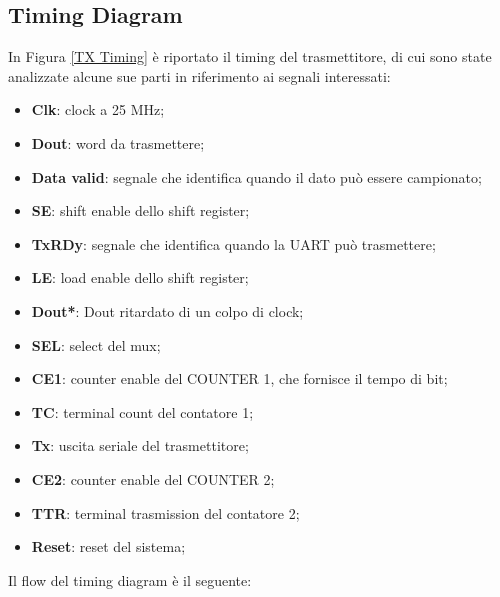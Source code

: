 \documentclass[a4paper, titlepage]{article}
\begin{document}
\subsection{Timing Diagram}%
In Figura \ref{TX Timing} è riportato il timing del trasmettitore, di cui sono state analizzate alcune sue parti in riferimento ai segnali interessati:
\begin{itemize}
\item 	\textbf{Clk}: clock a 25 MHz;
\item 	\textbf{Dout}: word da trasmettere;
\item 	\textbf{Data valid}: segnale che identifica quando il dato può essere campionato;
\item 	\textbf{SE}: shift enable dello shift register;
\item 	\textbf{TxRDy}: segnale che identifica quando la UART può trasmettere;
\item 	\textbf{LE}: load enable dello shift register;
\item 	\textbf{Dout*}: Dout ritardato di un colpo di clock;
\item 	\textbf{SEL}: select del mux;
\item 	\textbf{CE1}: counter enable del COUNTER 1, che fornisce il tempo di bit;
\item 	\textbf{TC}: terminal count del contatore 1;
\item 	\textbf{Tx}: uscita seriale del trasmettitore;
\item 	\textbf{CE2}: counter enable del COUNTER 2;
\item 	\textbf{TTR}: terminal trasmission del contatore 2;
\item \textbf{Reset}: reset del sistema;
\end{itemize}
Il flow del timing diagram è il seguente:
\end{document}
